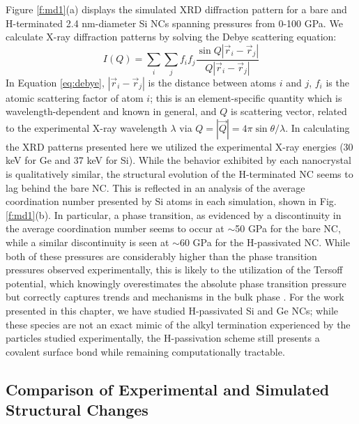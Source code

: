 Figure \ref{f:md1}(a) displays the simulated XRD diffraction pattern for a bare and H-terminated 2.4 nm-diameter Si NCs spanning pressures from 0-100 GPa. We calculate X-ray diffraction patterns by solving the Debye scattering equation:
\begin{equation}\label{eq:debye}
I(Q) = \sum_i\sum_j f_i f_j \frac{\sin{Q|\vec{r}_i - \vec{r}_j|}}{Q|\vec{r}_i - \vec{r}_j|}
\end{equation}
In Equation \ref{eq:debye}, $|\vec{r}_i - \vec{r}_j|$ is the distance between atoms $i$ and $j$, $f_i$ is the atomic scattering factor of atom $i$; this is an element-specific quantity which is wavelength-dependent and known in general, and $Q$ is scattering vector, related to the experimental X-ray wavelength $\lambda$ via $Q = |\vec{Q}| = 4\pi\sin{\theta/\lambda}$. In calculating the XRD patterns presented here we utilized the experimental X-ray energies (30 keV for Ge and 37 keV for Si). While the behavior exhibited by each nanocrystal is qualitatively similar, the structural evolution of the H-terminated NC seems to lag behind the bare NC. This is reflected in an analysis of the average coordination number presented by Si atoms in each simulation, shown in Fig. \ref{f:md1}(b). In particular, a phase transition, as evidenced by a discontinuity in the average coordination number seems to occur at $\sim$50 GPa for the bare NC, while a similar discontinuity is seen at $\sim$60 GPa for the H-passivated NC. While both of these pressures are considerably higher than the phase transition pressures observed experimentally, this is likely to the utilization of the Tersoff potential, which knowingly overestimates the absolute phase transition pressure but correctly captures trends and mechanisms in the bulk phase \cite{durandurdu2008diamond, PhysRevB.50.14952}. For the work presented in this chapter, we have studied H-passivated Si and Ge NCs; while these species are not an exact mimic of the alkyl termination experienced by the particles studied experimentally, the H-passivation scheme still presents a covalent surface bond while remaining computationally tractable.

\subsection{Comparison of Experimental and Simulated Structural Changes}


